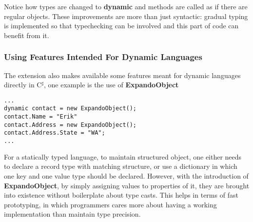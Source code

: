 Notice how types are changed to \textbf{dynamic} and methods are called
as if there are regular objects.
These improvements are more than just syntactic: gradual typing is implemented
so that typechecking can be involved and this part of code can benefit from it.

\subsubsection{Using Features Intended For Dynamic Languages}

The extension also makes available some features meant for dynamic languages
directly in C$^\sharp$, one example is the use of \textbf{ExpandoObject}

\begin{verbatim}
...
dynamic contact = new ExpandoObject();
contact.Name = "Erik"
contact.Address = new ExpandoObject();
contact.Address.State = "WA";
...
\end{verbatim}

For a statically typed language, to maintain structured object,
one either needs to declare a record type with matching structure,
or use a dictionary in which one key and one value type should be declared.
However, with the introduction of \textbf{ExpandoObject},
by simply assigning values to properties of it,
they are brought into existence without boilerplate about type casts.
This helps in terms of fast prototyping, in which programmers cares more about
having a working implementation than maintain type precision.


